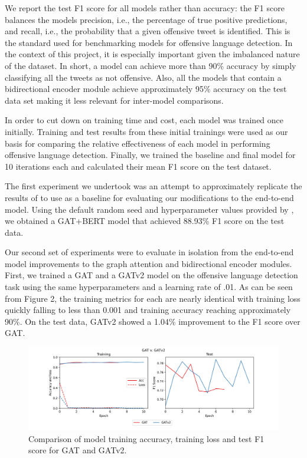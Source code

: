 \documentclass[letterpaper]{article} %
\begin{document}
We report the test F1 score for all models rather than accuracy: the F1 score balances the models precision, i.e., the percentage of true positive predictions, and recall, i.e., the probability that a given offensive tweet is identified. This is the standard used for benchmarking models for offensive language detection. In the context of this project, it is especially important given the imbalanced nature of the dataset. In short, a model can achieve more than 90\% accuracy by simply classifying all the tweets as not offensive. Also, all the models that contain a bidirectional encoder module achieve approximately 95\% accuracy on the test data set making it less relevant for inter-model comparisons. 

In order to cut down on training time and cost, each model was trained once initially. Training and test results from these initial trainings were used as our basis for comparing the relative effectiveness of each model in performing offensive language detection. Finally, we trained the baseline and final model for 10 iterations each and calculated their mean F1 score on the test dataset. 

The first experiment we undertook was an attempt to approximately replicate the results of \citet{Miao2022} to use as a baseline for evaluating our modifications to the end-to-end model. Using the default random seed and hyperparameter values provided by \citet{Miao2022}, we obtained a GAT+BERT model that achieved 88.93\% F1 score on the test data. 

Our second set of experiments were to evaluate in isolation from the end-to-end model improvements to the graph attention and bidirectional encoder modules. First, we trained a GAT and a GATv2 model on the offensive language detection task using the same hyperparameters and a learning rate of .01. As can be seen from Figure 2, the training metrics for each are nearly identical with training loss quickly falling to less than 0.001 and training accuracy reaching approximately 90\%. On the test data, GATv2 showed a 1.04\% improvement to the F1 score over GAT. 

\begin{figure}[!h]
    \includegraphics[width=\linewidth]{gat_v_gatv2.png}
    \caption{Comparison of model training accuracy, training loss and test F1 score for GAT and GATv2.}
\end{figure}
\end{document}
